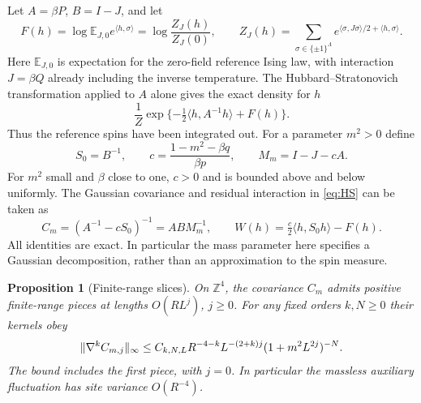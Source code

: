 \documentclass[11pt]{article}
\newtheorem{proposition}{Proposition}[section]
\newcommand{\E}{\mathbb E}
\newcommand{\Z}{\mathbb Z}
\DeclarePairedDelimiter{\norm}{\lVert}{\rVert}
\begin{document}
Let \(A=\beta P\), \(B=I-J\), and let
\[
 F(h)=\log \E_{J,0}e^{\langle h,\sigma\rangle}
     =\log\frac{Z_J(h)}{Z_J(0)},\qquad
 Z_J(h)=\sum_{\sigma\in\{\pm1\}^{\Lambda}}
   e^{\langle\sigma,J\sigma\rangle/2+\langle h,\sigma\rangle}.
\]
Here \(\E_{J,0}\) is expectation for the zero-field reference
Ising law, with interaction \(J=\beta Q\) already including the
inverse temperature. The Hubbard--Stratonovich transformation applied to \(A\) alone gives the exact density for \(h\)
\begin{equation}\label{eq:HS}
 \frac1Z\exp\{-\tfrac12\langle h,A^{-1}h\rangle+F(h)\}.
\end{equation}
Thus the reference spins have been integrated out. For a parameter \(m^2>0\) define
\[
 S_0=B^{-1},\qquad c=\frac{1-m^2-\beta q}{\beta p},\qquad
 M_m=I-J-cA .
\]
For \(m^2\) small and \(\beta\) close to one, \(c>0\) and is bounded above and below uniformly. The Gaussian covariance and residual interaction in \eqref{eq:HS} can be taken as
\begin{equation}\label{eq:preCov}
 C_m=(A^{-1}-cS_0)^{-1}=ABM_m^{-1},\qquad
 W(h)=\tfrac c2\langle h,S_0h\rangle-F(h).
\end{equation}
All identities are exact. In particular the mass parameter here specifies a Gaussian decomposition, rather than an approximation to the spin measure.

\begin{proposition}[Finite-range slices]\label{prop:frd}
On \(\Z^4\), the covariance \(C_m\) admits positive finite-range pieces at lengths \(O(RL^j)\), \(j\ge0\). For any fixed orders \(k,N\ge0\) their kernels obey
\begin{equation}\label{eq:slicebound}
 \norm{\nabla^k C_{m,j}}_\infty
 \le C_{k,N,L}R^{-4-k}L^{-(2+k)j}(1+m^2 L^{2j})^{-N}.
\end{equation}
The bound includes the first piece, with \(j=0\). In particular the massless auxiliary fluctuation has site variance \(O(R^{-4})\).
\end{proposition}
\end{document}
